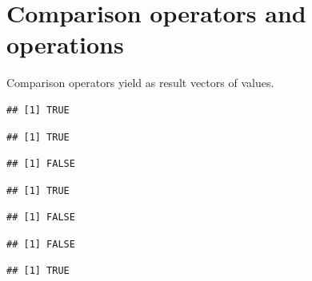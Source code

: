 \documentclass[krantz2]{krantz}\usepackage{knitr}%
\begin{document}
\section{Comparison operators and operations}
\qRoperator{>}\qRoperator{<}\qRoperator{>=}\qRoperator{<=}\qRoperator{==}\qRoperator{!=}
Comparison operators yield as result vectors of  values.

\begin{knitrout}\footnotesize
{}\color{fgcolor}\begin{kframe}
\begin{alltt}
 \hlopt{>} 
\end{alltt}
\begin{verbatim}
## [1] TRUE
\end{verbatim}
\begin{alltt}
 \hlopt{>=} 
\end{alltt}
\begin{verbatim}
## [1] TRUE
\end{verbatim}
\begin{alltt}
 \hlopt{==}  
\end{alltt}
\begin{verbatim}
## [1] FALSE
\end{verbatim}
\begin{alltt}
 \hlopt{!=} 
\end{alltt}
\begin{verbatim}
## [1] TRUE
\end{verbatim}
\begin{alltt}
 \hlopt{<=} 
\end{alltt}
\begin{verbatim}
## [1] FALSE
\end{verbatim}
\begin{alltt}
 \hlopt{<} 
\end{alltt}
\begin{verbatim}
## [1] FALSE
\end{verbatim}
\begin{alltt}
 \hlkwb{<-} 
 \hlopt{<}  \hlopt{&&}  \hlopt{>} 
\end{alltt}
\begin{verbatim}
## [1] TRUE
\end{verbatim}
\end{kframe}
\end{knitrout}
\end{document}
